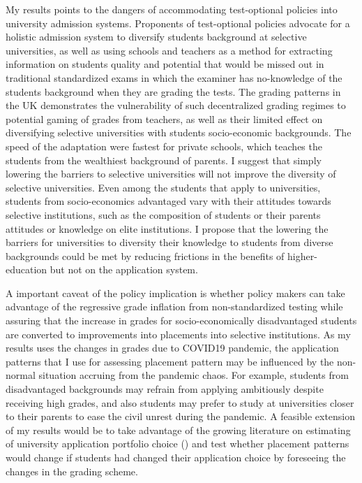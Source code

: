 My results points to the dangers of accommodating test-optional policies into university admission systems. Proponents of test-optional policies advocate for a holistic admission system to diversify students background at selective universities, as well as using schools and teachers as a method for extracting information on students quality and potential that would be missed out in traditional standardized exams in which the examiner has no-knowledge of the students background when they are grading the tests. The grading patterns in the UK demonstrates the vulnerability of such decentralized grading regimes to potential gaming of grades from teachers, as well as their limited effect on diversifying selective universities with students socio-economic backgrounds. The speed of the adaptation were fastest for private schools, which teaches the students from the wealthiest background of parents. I suggest that simply lowering the barriers to selective universities will not improve the diversity of selective universities. Even among the students that apply to universities, students from socio-economics advantaged vary with their attitudes towards selective institutions, such as the composition of students or their parents attitudes or knowledge on elite institutions. I propose that the lowering the barriers for universities to diversity their knowledge to students from diverse backgrounds could be met by reducing frictions in the benefits of higher-education but not on the application system.

A important caveat of the policy implication is whether policy makers can take advantage of the regressive grade inflation from non-standardized testing while assuring that the increase in grades for socio-economically disadvantaged students are converted to improvements into placements into selective institutions. As my results uses the changes in grades due to COVID19 pandemic, the application patterns that I use for assessing placement pattern may be influenced by the non-normal situation accruing from the pandemic chaos. For example, students from disadvantaged backgrounds may refrain from applying ambitiously despite receiving high grades, and also students may prefer to study at universities closer to their parents to ease the civil unrest during the pandemic. A feasible extension of my results would be to take advantage of the growing literature on estimating of university application portfolio choice (\cite{10.1257/aer.20211137}) and test whether placement patterns would change if students had changed their application choice by foreseeing the changes in the grading scheme.


